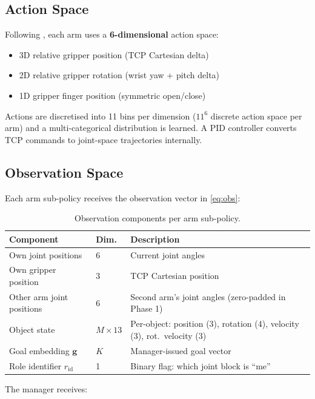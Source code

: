 \documentclass[12pt, a4paper]{article}
\newcommand{\goalvec}{\mathbf{g}}
\begin{document}
\subsection{Action Space}
\label{subsec:action_space}

Following \citet{plappert2021asymmetric}, each arm uses a \textbf{6-dimensional} action
space:
\begin{itemize}[nosep]
    \item 3D relative gripper position (TCP Cartesian delta)
    \item 2D relative gripper rotation (wrist yaw + pitch delta)
    \item 1D gripper finger position (symmetric open/close)
\end{itemize}
Actions are discretised into 11 bins per dimension ($11^6$ discrete action space per arm)
and a multi-categorical distribution is learned. A PID controller converts TCP commands to
joint-space trajectories internally.

\subsection{Observation Space}
\label{subsec:obs_space}

Each arm sub-policy receives the observation vector in \cref{eq:obs}:

\begin{table}[h!]
\centering
\caption{Observation components per arm sub-policy.}
\begin{tabularx}{\textwidth}{llX}
\toprule
Component & Dim. & Description \\
\midrule
Own joint positions & 6 & Current joint angles \\
Own gripper position & 3 & TCP Cartesian position \\
Other arm joint positions & 6 & Second arm's joint angles (zero-padded in Phase 1) \\
Object state & $M \times 13$ & Per-object: position (3), rotation (4), velocity (3),
                               rot.\ velocity (3) \\
Goal embedding $\goalvec$ & $K$ & Manager-issued goal vector \\
Role identifier $r_{\mathrm{id}}$ & 1 & Binary flag: which joint block is ``me'' \\
\bottomrule
\end{tabularx}
\label{tab:obs}
\end{table}

The manager receives:
\end{document}
